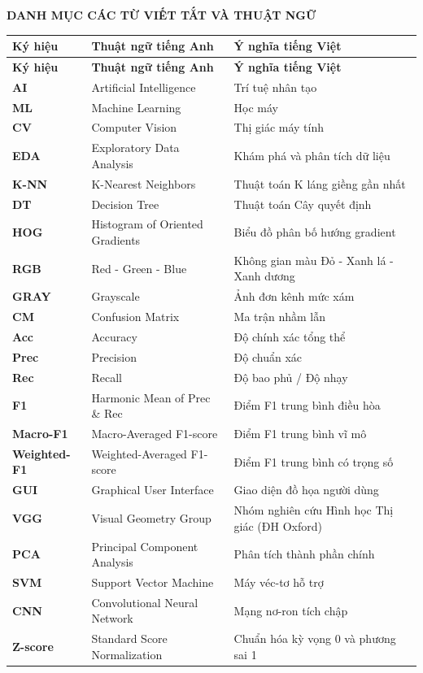 \documentclass[../DoAn.tex]{subfiles}
\begin{document}
\hfuzz=10pt
\vfuzz=10pt

\begin{center}
    \Large{\textbf{DANH MỤC CÁC TỪ VIẾT TẮT VÀ THUẬT NGỮ}}
\end{center}
\vspace{0.8cm}

\begin{longtable}{@{}l >{\raggedright\arraybackslash}p{5.5cm} >{\raggedright\arraybackslash}p{6.5cm}@{}}
\hline
\textbf{Ký hiệu} & \textbf{Thuật ngữ tiếng Anh} & \textbf{Ý nghĩa tiếng Việt} \\ \hline
\endfirsthead
\hline
\textbf{Ký hiệu} & \textbf{Thuật ngữ tiếng Anh} & \textbf{Ý nghĩa tiếng Việt} \\ \hline
\endhead
\hline
\endfoot
\hline
\endlastfoot
\textbf{AI} & Artificial Intelligence & Trí tuệ nhân tạo \\
\textbf{ML} & Machine Learning & Học máy \\
\textbf{CV} & Computer Vision & Thị giác máy tính \\
\textbf{EDA} & Exploratory Data Analysis & Khám phá và phân tích dữ liệu \\
\textbf{K-NN} & K-Nearest Neighbors & Thuật toán K láng giềng gần nhất \\
\textbf{DT} & Decision Tree & Thuật toán Cây quyết định \\
\textbf{HOG} & Histogram of Oriented Gradients & Biểu đồ phân bố hướng gradient \\
\textbf{RGB} & Red - Green - Blue & Không gian màu Đỏ - Xanh lá - Xanh dương \\
\textbf{GRAY} & Grayscale & Ảnh đơn kênh mức xám \\
\textbf{CM} & Confusion Matrix & Ma trận nhầm lẫn \\
\textbf{Acc} & Accuracy & Độ chính xác tổng thể \\
\textbf{Prec} & Precision & Độ chuẩn xác \\
\textbf{Rec} & Recall & Độ bao phủ / Độ nhạy \\
\textbf{F1} & Harmonic Mean of Prec \& Rec & Điểm F1 trung bình điều hòa \\
\textbf{Macro-F1} & Macro-Averaged F1-score & Điểm F1 trung bình vĩ mô \\
\textbf{Weighted-F1} & Weighted-Averaged F1-score & Điểm F1 trung bình có trọng số \\
\textbf{GUI} & Graphical User Interface & Giao diện đồ họa người dùng \\
\textbf{VGG} & Visual Geometry Group & Nhóm nghiên cứu Hình học Thị giác (ĐH Oxford) \\
\textbf{PCA} & Principal Component Analysis & Phân tích thành phần chính \\
\textbf{SVM} & Support Vector Machine & Máy véc-tơ hỗ trợ \\
\textbf{CNN} & Convolutional Neural Network & Mạng nơ-ron tích chập \\
\textbf{Z-score} & Standard Score Normalization & Chuẩn hóa kỳ vọng 0 và phương sai 1 \\
\end{longtable}
\end{document}
